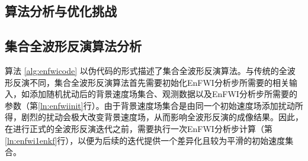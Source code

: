 \documentclass[degree=doctor]{thuthesis}
\begin{document}
\subsection{算法分析与优化挑战}

\subsection{集合全波形反演算法分析}
算法 \ref{alg:enfwicode} 以伪代码的形式描述了集合全波形反演算法。与传统的全波形反演不同，集合全波形反演算法首先需要初始化EnFWI分析步所需要的相关输入，如添加随机扰动后的背景速度场集合、观测数据以及EnFWI分析步所需要的参数（第\ref{ln:enfwiinit}行）。由于背景速度场集合是由同一个初始速度场添加扰动所得，剧烈的扰动会极大改变背景速度场，从而影响全波形反演的成像结果。因此，在进行正式的全波形反演迭代之前，需要执行一次EnFWI分析步计算（第\ref{ln:enfwi1enkf}行），以便为后续的迭代提供一个差异化且较为平滑的初始速度集合。
\end{document}
